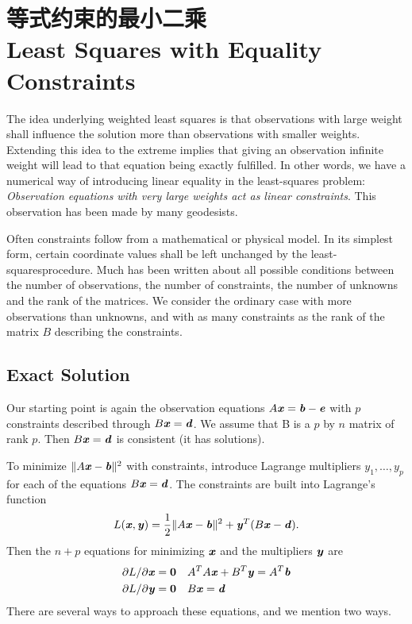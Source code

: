 \section[等式约束的最小二乘]{等式约束的最小二乘\\Least Squares with Equality Constraints}
\begin{flushleft}
	The idea underlying weighted least squares is that observations with large weight shall influence the solution more than observations with smaller weights. Extending this idea to the extreme implies that giving an observation infinite weight will lead to that equation being exactly fulfilled. In other words, we have a numerical way of introducing linear equality in the least-squares problem: \textit{Observation equations with very large weights act as linear constraints}. This observation has been made by many geodesists.
\end{flushleft}

Often constraints follow from a mathematical or physical model. In its simplest form, certain coordinate values shall be left unchanged by the least-squaresprocedure. Much has been written about all possible conditions between the number of observations, the number of constraints, the number of unknowns and the rank of the matrices. We consider the ordinary case with more observations than unknowns, and with as many constraints as the rank of the matrix $B$ describing the constraints.
\subsection{Exact Solution}

\begin{flushleft}
	Our starting point is again the observation equations $A\textbf{\textit{x}}=\textbf{\textit{b}}-\textbf{\textit{e}}$ with $p$ constraints described through $B\textbf{\textit{x}}=\textbf{\textit{d}}$. We assume that B is a $p$ by $n$ matrix of rank $p$. Then $B\textbf{\textit{x}}=\textbf{\textit{d}}$ is consistent (it has solutions).
\end{flushleft}

To minimize $ \lVert A\textbf{\textit{x}}-\textbf{\textit{b}} \rVert^{2}$ with constraints, introduce Lagrange multipliers $y_{1},\ldots,y_{p}$
for each of the equations $B\textbf{\textit{x}}=\textbf{\textit{d}}$. The constraints are built into Lagrange's function
\begin{align}
L(\textbf{\textit{x}},\textbf{\textit{y}}) = \dfrac{1}{2} \lVert A\textbf{\textit{x}}-\textbf{\textit{b}} \rVert^{2} + \textbf{\textit{y}}^{T}(B\textbf{\textit{x}}-\textbf{\textit{d}}). 
\end{align}
Then the $n+p$ equations for minimizing $\textbf{\textit{x}}$ and the multipliers $\textbf{\textit{y}}$ are
\begin{align*}
\partial L/ \partial \textbf{\textit{x}} &= \textbf{0}  & &
	A^{T}A\textbf{\textit{x}} + B^{T}\textbf{\textit{y}} = A^{T}\textbf{\textit{b}} \\
\partial L/ \partial \textbf{\textit{y}} &= \textbf{0}  & & 
B\textbf{\textit{x}}  = \textbf{\textit{d}} 	
\end{align*}
There are several ways to approach these equations, and we mention two ways.

